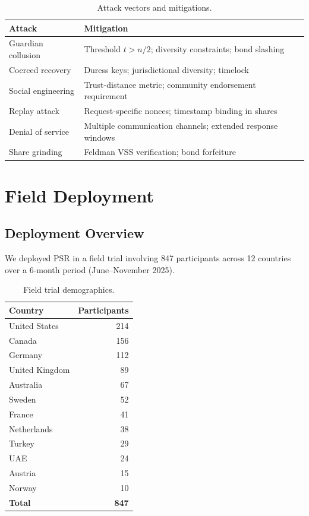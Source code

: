 \documentclass[11pt,a4paper,twocolumn]{article}
\begin{document}
\begin{table}[H]
\centering
\caption{Attack vectors and mitigations.}
\label{tab:attacks}
\begin{tabular}{@{}p{2.5cm}p{4.5cm}@{}}
\toprule
\textbf{Attack} & \textbf{Mitigation} \\
\midrule
Guardian collusion & Threshold $t > n/2$; diversity constraints; bond slashing \\
Coerced recovery & Duress keys; jurisdictional diversity; timelock \\
Social engineering & Trust-distance metric; community endorsement requirement \\
Replay attack & Request-specific nonces; timestamp binding in shares \\
Denial of service & Multiple communication channels; extended response windows \\
Share grinding & Feldman VSS verification; bond forfeiture \\
\bottomrule
\end{tabular}
\end{table}

\section{Field Deployment}\label{sec:deployment}

\subsection{Deployment Overview}

We deployed PSR in a field trial involving 847 participants across 12 countries over a 6-month period (June--November 2025).

\begin{table}[H]
\centering
\caption{Field trial demographics.}
\label{tab:demographics}
\begin{tabular}{@{}lr@{}}
\toprule
\textbf{Country} & \textbf{Participants} \\
\midrule
United States & 214 \\
Canada & 156 \\
Germany & 112 \\
United Kingdom & 89 \\
Australia & 67 \\
Sweden & 52 \\
France & 41 \\
Netherlands & 38 \\
Turkey & 29 \\
UAE & 24 \\
Austria & 15 \\
Norway & 10 \\
\midrule
\textbf{Total} & \textbf{847} \\
\bottomrule
\end{tabular}
\end{table}
\end{document}
